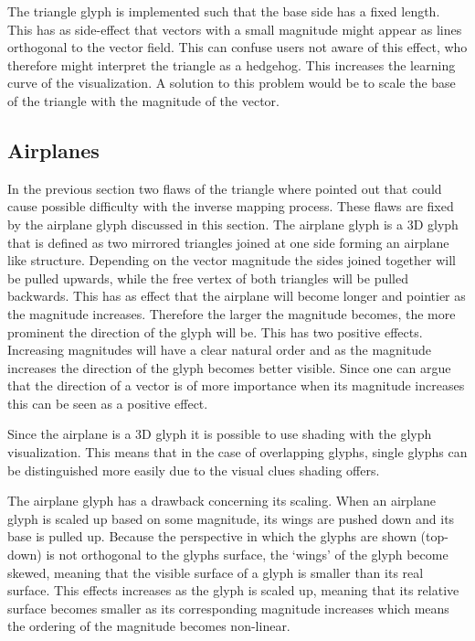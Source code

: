 The triangle glyph is implemented such that the base side has a fixed length. This has as side-effect that vectors with a small magnitude might appear as lines orthogonal to the vector field. This can confuse users not aware of this effect, who therefore might interpret the triangle as a hedgehog. This increases the learning curve of the visualization. A solution to this problem would be to scale the base of the triangle with the magnitude of the vector. 

\subsection{Airplanes} %
\label{sub:airplanes}
In the previous section two flaws of the triangle where pointed out that could cause possible difficulty with the inverse mapping process. These flaws are fixed by the airplane glyph discussed in this section. The airplane glyph is a 3D glyph that is defined as two mirrored triangles joined at one side forming an airplane like structure. Depending on the vector magnitude the sides joined together will be pulled upwards, while the free vertex of both triangles will be pulled backwards. This has as effect that the airplane will become longer and pointier as the magnitude increases. Therefore the larger the magnitude becomes, the more prominent the direction of the glyph will be. This has two positive effects. Increasing magnitudes will have a clear natural order and as the magnitude increases the direction of the glyph becomes better visible. Since one can argue that the direction of a vector is of more importance when its magnitude increases this can be seen as a positive effect.

Since the airplane is a 3D glyph it is possible to use shading with the glyph visualization. This means that in the case of overlapping glyphs, single glyphs can be distinguished more easily due to the visual clues shading offers. 

The airplane glyph has a drawback concerning its scaling. When an airplane glyph is scaled up based on some magnitude, its wings are pushed down and its base is pulled up. Because the perspective in which the glyphs are shown (top-down) is not orthogonal to the glyphs surface, the `wings' of the glyph become skewed, meaning that the visible surface of a glyph is smaller than its real surface. This effects increases as the glyph is scaled up, meaning that its relative surface becomes smaller as its corresponding magnitude increases which means the ordering of the magnitude becomes non-linear. 


